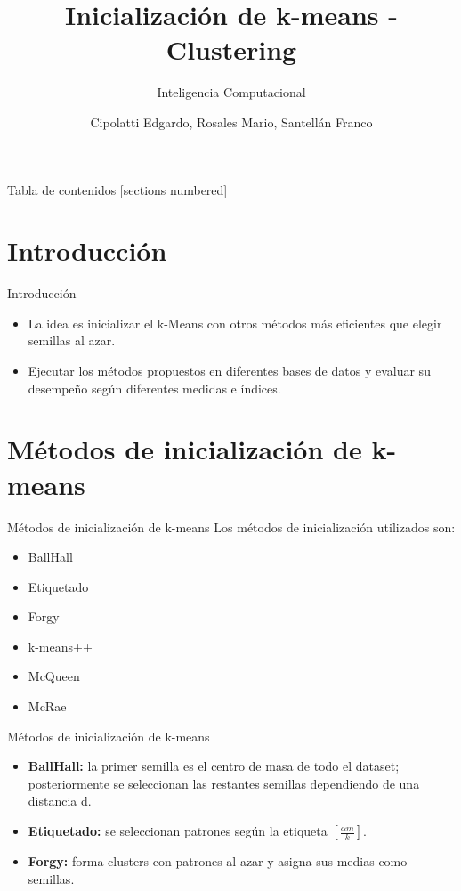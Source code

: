 \documentclass[10pt]{beamer}
\title{Inicialización de k-means - Clustering}
\subtitle{Inteligencia Computacional}
\date{}
\author{Cipolatti Edgardo, Rosales Mario, Santellán Franco}
\institute{Director: Leandro Di Persia}
\begin{document}
\maketitle

\begin{frame}{Tabla de contenidos}
  [sections numbered]
  \tableofcontents[hideallsubsections]
\end{frame}

\section{Introducción}

\begin{frame}[fragile]{Introducción}
\begin{itemize}

  	\item La idea es inicializar el k-Means con otros métodos m\'{a}s eficientes que elegir semillas al azar.
  \vspace{5mm}
	\item Ejecutar los métodos propuestos en diferentes bases de datos y evaluar su desempeño según diferentes medidas e índices.
\end{itemize}  
\end{frame}

\section{Métodos de inicialización de k-means}

\begin{frame}[fragile]{Métodos de inicialización de k-means}
   Los métodos de inicialización utilizados son:
   \begin{itemize}
	\item BallHall
   	\item Etiquetado
   	\item Forgy
   	\item k-means++
   	\item McQueen
   	\item McRae
   \end{itemize}
\end{frame}

\begin{frame}{Métodos de inicialización de k-means}
  \begin{itemize}
    \item \textbf{BallHall:} la primer semilla es el centro de masa de todo el dataset; posteriormente se seleccionan las restantes semillas dependiendo de una distancia d.
       	\vspace{10mm}
   	\item \textbf{Etiquetado:} se seleccionan patrones según la etiqueta $\left [  \frac{\alpha m}{k}\right ]$.
		   	\vspace{10mm}
   	\item \textbf{Forgy:} forma clusters con patrones al azar y asigna sus medias como semillas.
   	
  \end{itemize}
\end{frame}
\end{document}
